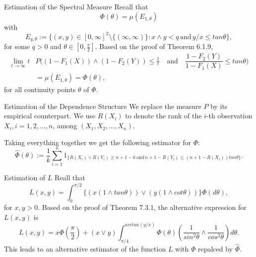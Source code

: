 \documentclass[11pt]{beamer}
\begin{document}
\begin{frame}{Estimation of the Spectral Measure}
Recall that 
\begin{displaymath}
\Phi(\theta)=\mu(E_{1,\theta})
\end{displaymath}
with
\begin{displaymath}
E_{q,\theta}:=\{ (x,y)\in [0,\infty]^2\setminus \{ (\infty,\infty)\} : x\land y<q \,\text{and}\, y/x \le tan \theta \},
\end{displaymath}
for some $q>0$ and $\theta \in [0,\frac{\pi}{2}]$.
Based on the proof of Theorem 6.1.9,
\begin{displaymath}
\begin{split}
\lim_{t\to \infty} t &P\big ( (1-F_1(X))\land (1-F_2(Y)) \le \frac{1}{t} \quad \text{and} \quad \dfrac{1-F_2(Y)}{1-F_1(X)}\le tan \theta\big) \\
&=\mu(E_{1,\theta})=\Phi(\theta),
\end{split}
\end{displaymath}
for all continuity points $\theta$ of $\Phi$.
\end{frame}
\begin{frame}{Estimation of the Dependence Structure}
We replace the measure $P$ by its empirical counterpart. We use $R(X_i)$ to denote the rank of the $i$-th observation $X_i, i=1,2,\dots,n$, among $(X_1,X_2,\dots, X_n)$.\par 
Taking everything together we get the following estimator for $\Phi$:
\begin{displaymath}
\hat{\Phi}(\theta):=\frac{1}{k} \sum_{i=1}^n 1_{\{ R(X_i) \lor R(Y_i) \ge n+1-k\, \text{and} \, n+1-R(Y_i)\le (n+1-R(X_i)) tan \theta \}}.
\end{displaymath}

\end{frame}

\begin{frame}{Estimation of $L$}
Reall that
\begin{displaymath}
L(x,y)=\int_0^{\pi/2} \{     (x(1\land tan\theta))\lor (y(1\land cot \theta))                    \} \Phi(d\theta),
\end{displaymath}
for $x,y>0$. 
Based on the proof of Theorem 7.3.1, the alternative expression for $L(x,y)$ is
\begin{displaymath}
L(x,y)=x\Phi(\frac{\pi}{2}) +(x\lor y)\int_{\pi/4}^{arctan(y/x)} \Phi(\theta)(\frac{1}{sin^2 \theta} \land \frac{1}{cos^2 \theta} )d\theta.
\end{displaymath}
This leads to an alternative estimator of the function $L$ with $\Phi$ repalced by $\hat{\Phi}$.
\end{frame}
\end{document}
